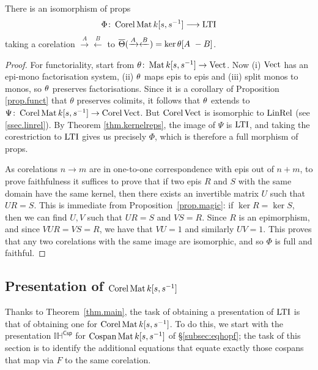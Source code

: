 \begin{theorem}\label{thm.main}
  There is an isomorphism of props 
  \[
    \Phi{\colon} \operatorname{{Corel}}\operatorname{\mathrm{Mat}}{k[s,s^{-1}]} \longrightarrow \operatorname{\mathrm{LTI}}
  \]
  taking a corelation $\xrightarrow{A}\xleftarrow{B}$ 
  to $\overline{\Theta}(\xrightarrow{A}\xleftarrow{B}) = {\ker\theta [A \ -B]}$.
\end{theorem}
\begin{proof}
  For functoriality, start from $\theta{\colon}\operatorname{\mathrm{Mat}}{k[s,s^{-1}]} \to
  \operatorname{\mathrm{Vect}}$. Now (i) $\operatorname{\mathrm{Vect}}$ has an epi-mono factorisation system, (ii)
  $\theta$ maps epis to epis and (iii) split monos to monos, so $\theta$
  preserves factorisations. Since it is a corollary of Proposition \ref{prop.funct}
  that $\theta$ preserves colimits, it follows that $\theta$ extends to
   $\Psi{\colon}\operatorname{{Corel}}\operatorname{\mathrm{Mat}}{k[s,s^{-1}]} \to \operatorname{{Corel}}\operatorname{\mathrm{Vect}}$. But $\operatorname{{Corel}}\operatorname{\mathrm{Vect}}$ is
   isomorphic to $\operatorname{\mathrm{LinRel}}$ (see \textsection\ref{ssec.linrel}). 
  By Theorem \ref{thm.kernelreps}, the image of $\Psi$ is $\operatorname{\mathrm{LTI}}$, and taking
  the corestriction to $\operatorname{\mathrm{LTI}}$ gives us precisely $\Phi$, which is therefore a full
  morphism of props.

  As corelations $n \to m$ are in one-to-one correspondence with epis out of
  $n+m$, to prove faithfulness it suffices to prove that if two epis $R$ and $S$
  with the same domain have the same kernel, then there exists an invertible
  matrix $U$ such that $UR =S$. This is immediate from
  Proposition~\ref{prop.magic}: if $\ker R= \ker S$, then we can find $U, V$
  such that $UR = S$ and $VS = R$. Since $R$ is an epimorphism, and since $VUR =
  VS = R$, we have that $VU=1$ and similarly $UV =1$. This proves that any two
  corelations with the same image are isomorphic, and so $\Phi$ is full and
  faithful.  
\end{proof}


\subsection{Presentation of $\operatorname{{Corel}}\operatorname{\mathrm{Mat}}{k[s,s^{-1}]}$}


Thanks to Theorem~\ref{thm.main}, the task of obtaining a presentation of $\operatorname{\mathrm{LTI}}$
is that of obtaining one for $\operatorname{{Corel}}\operatorname{\mathrm{Mat}}{k[s,s^{-1}]}$. 
%
To do this, we start with the presentation
$\mathbb{IH}^{\textsf{Csp}}$ for $\operatorname{{Cospan}}\operatorname{\mathrm{Mat}}{k[s,s^{-1}]}$ of \S\ref{subsec:eqhopf}; the task of
this section is to identify the additional equations that equate
exactly those cospans that map via $F$ to the same corelation.

